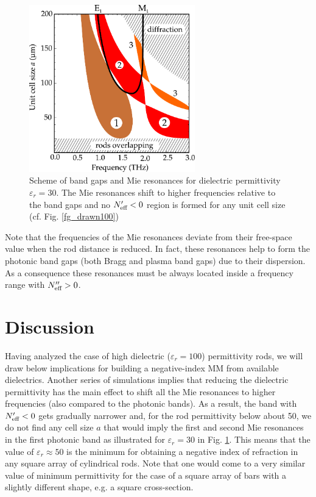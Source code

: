\documentclass[letterpaper,12pt]{report}
\begin{document}
\begin{figure}[h]
  \centering
    \includegraphics[width=7.2cm]{img/ERods_eps030_spacingscan_drawn_bands.pdf}
    \caption{Scheme of band gaps and Mie resonances for dielectric permittivity $\varepsilon_r = 30$. The Mie resonances shift to higher frequencies relative to the band gaps and no $N_{\text{eff} }'<0$ region is formed for any unit cell size (cf. Fig. \ref{fg_drawn100})}
\label{fg_drawn030}
\end{figure}

Note that the frequencies of the Mie resonances deviate from their free-space value when
the rod distance is reduced. In fact, these resonances help to form the photonic band
gaps (both Bragg and plasma band gaps) due to their dispersion. As a consequence these
resonances must be always located inside a frequency range with $N_{\text{eff} }''>0$.

\section{Discussion}
Having analyzed the case of high dielectric ($\varepsilon_r=100$) permittivity rods, we
will draw below implications for building a negative-index MM from available dielectrics.
Another series of simulations implies that reducing the dielectric permittivity has the main effect
to shift all the Mie resonances to higher frequencies (also compared to the photonic
bands). As a result, the band with $N_{\text{eff} }'<0$ gets gradually narrower and, for the rod
permittivity below about 50, we do not find any cell size $a$ that would imply the first
and second Mie resonances in the first photonic band as illustrated for $\varepsilon_r = 30$ in Fig. \ref{fg_drawn030}. This means that the value of
$\varepsilon_{r} \approx 50$ is the minimum for obtaining a negative index of refraction
in any square array of cylindrical rods. Note that one would come to a very similar value
of minimum permittivity for the case of a square array of bars with a slightly different
shape, e.g. a square cross-section. 
\end{document}
